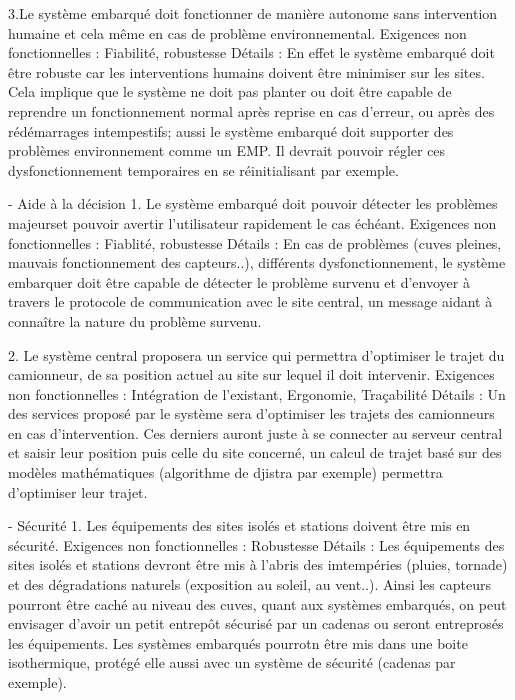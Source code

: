 3.Le système embarqué doit fonctionner de manière autonome sans intervention humaine et cela même en cas de problème
environnemental.
Exigences non fonctionnelles : Fiabilité, robustesse
Détails : En effet le système embarqué doit être robuste car les interventions humains doivent être minimiser sur
les sites. Cela implique que le système ne doit pas planter ou doit être capable de reprendre un fonctionnement normal
après reprise en cas d'erreur, ou après des rédémarrages intempestifs; aussi le système embarqué doit supporter des 
problèmes environnement comme un EMP. Il devrait pouvoir régler ces dysfonctionnement temporaires en se 
réinitialisant par exemple.


- Aide à la décision
1. Le système embarqué doit pouvoir détecter les problèmes majeurset pouvoir avertir l'utilisateur rapidement le cas
échéant.
Exigences non fonctionnelles : Fiablité, robustesse
Détails : En cas de problèmes (cuves pleines, mauvais fonctionnement des capteurs..), différents dysfonctionnement,
le système embarquer doit être capable de détecter le problème survenu et d'envoyer à travers le protocole de
communication avec le site central, un message aidant à connaître la nature du problème survenu.

2. Le système central proposera un service qui permettra d'optimiser le trajet du camionneur, de sa position
actuel au site sur lequel il doit intervenir.
Exigences non fonctionnelles : Intégration de l'existant, Ergonomie, Traçabilité
Détails : Un des services proposé par le système sera d'optimiser les trajets des camionneurs en cas d'intervention.
Ces derniers auront juste à se connecter au serveur central et saisir leur position puis celle du site concerné,
un calcul de trajet basé sur des modèles mathématiques (algorithme de djistra par exemple) permettra d'optimiser 
leur trajet.

- Sécurité
1. Les équipements des sites isolés et stations doivent être mis en sécurité.
Exigences non fonctionnelles : Robustesse
Détails : Les équipements des sites isolés et stations devront être mis à l'abris des imtempéries (pluies, tornade) 
et des dégradations naturels (exposition au soleil, au vent..). Ainsi les capteurs pourront être caché au niveau 
des cuves, quant aux systèmes embarqués, on peut envisager d'avoir un petit entrepôt sécurisé par un cadenas ou 
seront entreprosés les équipements. Les systèmes embarqués pourrotn être mis dans une boite isothermique, 
protégé elle aussi avec un système de sécurité (cadenas par exemple).

